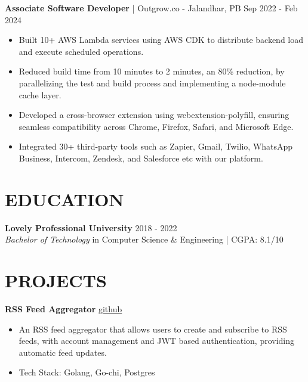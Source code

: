 \documentclass[]{resume}
\begin{document}
\textbf{Associate Software Developer} | Outgrow.co - Jalandhar, PB \hfill Sep 2022 - Feb 2024
\begin{itemize}
    \item Built 10+ AWS Lambda services using AWS CDK to distribute backend load and execute scheduled operations.
    \item Reduced build time from 10 minutes to 2 minutes, an 80\% reduction, by parallelizing the test and build process and implementing a node-module cache layer.
    \item Developed a cross-browser extension using webextension-polyfill, ensuring seamless compatibility across Chrome, Firefox, Safari, and Microsoft Edge.
    \item Integrated 30+ third-party tools such as Zapier, Gmail, Twilio, WhatsApp Business, Intercom, Zendesk, and Salesforce etc with our platform.
\end{itemize}

\section{EDUCATION}
\textbf{Lovely Professional University}  \hfill 2018 - 2022 \\
\textit{Bachelor of Technology} in Computer Science \& Engineering | CGPA: 8.1/10

\section{PROJECTS}
\textbf{RSS Feed Aggregator} \hfill \href{https://github.com/saswatax/rss-aggregator}{github\space\faLink}
\begin{itemize}
    \item An RSS feed aggregator that allows users to create and subscribe to RSS feeds, with account management and JWT based authentication, providing automatic feed updates.
    \item Tech Stack: Golang, Go-chi, Postgres
\end{itemize}
\end{document}
